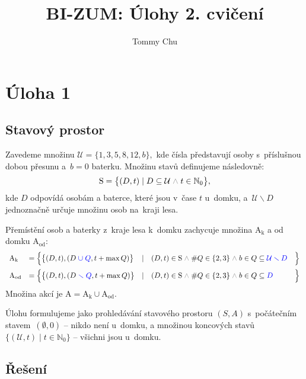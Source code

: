 \documentclass{article}
\title{BI-ZUM: Úlohy 2. cvičení}
\author{Tommy Chu}
\date{}
\newcommand{\Nz}{\mathbb{N}_0}
\newcommand{\U}{\mathcal{U}}
\newcommand{\mS}{\text{S}}
\newcommand{\A}{\text{A}}
\newcommand{\mand}{\;{\color{gray} \land}\;}
\begin{document}
    \maketitle

    \section*{Úloha 1}

    \subsection*{Stavový prostor}

    Zavedeme množinu
    \(
    \U = \{ 1, 3, 5, 8, 12, b \},
    \)
    kde čísla představují osoby s~příslušnou dobou přesunu a~$b = 0$ baterku.
    Množinu stavů definujeme následovně:
    \[
        \mS = \big\{
        (D, t) \mid D \subseteq \U \mand t \in \Nz
        \big\},
    \]
    kde $D$ odpovídá osobám a baterce, které jsou v~čase $t$ u~domku, a~$\U \smallsetminus D$ jednoznačně určuje množinu osob na~kraji lesa.

    Přemístění osob a baterky z~kraje lesa k~domku zachycuje množina $\A_\text{k}$
    a od domku $\A_\text{od}$:
    \[
        \begin{array}{llllll}
            \A_\text{k}
            & = \Big\{
            \big\{ (D, t), (D {\color{blue} \;\cup\; Q}, t + \max Q) \big\}
            & \mid
            & (D, t) \in \mS \mand \# Q \in \{2, 3\}
            \mand b \in Q \subseteq  {\color{blue} \U\smallsetminus D}
            & \Big\}

            \\[3mm]

            \A_\text{od}
            & = \Big\{
            \big\{ (D, t), (D {\color{blue} \;\smallsetminus\; Q}, t + \max Q) \big\}
            & \mid
            & (D, t) \in \mS \mand \# Q \in \{2, 3\}
            \mand b \in Q \subseteq {\color{blue} D}
            & \Big\}
        \end{array}
    \]
    Množina akcí je $\A = \A_\text{k} \cup \A_\text{od}$.

    Úlohu formulujeme jako prohledávání stavového prostoru $(S, A)$ s~počátečním stavem~$(\emptyset, 0)$ -- nikdo není u~domku, a množinou koncových stavů~$\{ (\U, t) \mid t \in \Nz \}$ -- všichni jsou u~domku.

    \subsection*{Řešení}
\end{document}
